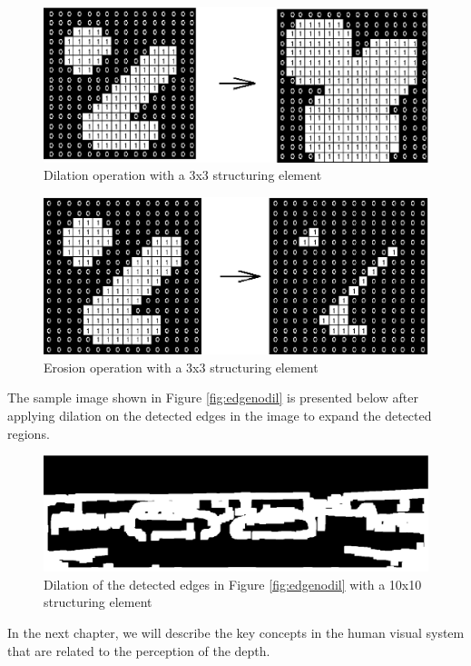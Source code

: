 \begin{figure}[H]
\centering
\includegraphics[scale=0.8]{diltbin}
\caption{Dilation operation with a 3x3 structuring element \cite{HIPRdil}}
\label{fig:dilate}
\end{figure} 

\begin{figure}[H]
\centering
\includegraphics[scale=0.8]{erodbin}
\caption{Erosion operation with a 3x3 structuring element \cite{HIPRerod}}
\label{fig:erode}
\end{figure} 
The sample image shown in Figure \ref{fig:edgenodil} is presented below after applying dilation on the detected edges in the image to expand the 
detected regions.

\begin{figure}[H]
\centering
\includegraphics[scale=0.35]{mask5dil}
\caption{Dilation of the detected edges in Figure \protect\ref{fig:edgenodil} with a 10x10 structuring element}
\label{fig:edgedil}
\end{figure}
\noindent
In the next chapter, we will describe the key concepts in the human visual system that are related to the perception of the depth.

